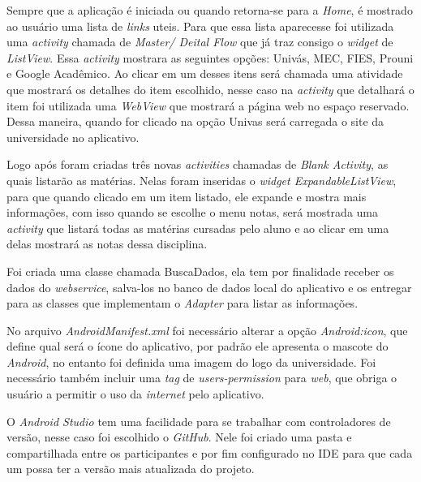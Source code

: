 		\par Sempre que a aplicação é iniciada ou quando retorna-se para a
	\textit{Home}, é mostrado ao usuário uma lista de \textit{links} uteis. Para
	que essa lista aparecesse foi utilizada uma \textit{activity} chamada de
	\textit{Master/ Deital Flow} que já traz consigo o \textit{widget} de
	\textit{ListView}. Essa \textit{activity} mostrara as seguintes opções: Univás,
	MEC, FIES, Prouni e Google Acadêmico. Ao clicar em um desses itens será chamada
	uma atividade que mostrará os detalhes do item escolhido, nesse caso na
	\textit{activity} que detalhará o item foi utilizada uma \textit{WebView} que
	mostrará a página web no espaço reservado. Dessa maneira, quando for clicado na
	opção Univas será carregada o site da universidade no aplicativo.

		\par Logo após foram criadas três novas \textit{activities} chamadas de
	\textit{Blank Activity}, as quais listarão as matérias. Nelas foram inseridas o
	\textit{widget ExpandableListView}, para que quando clicado em um item listado,
	ele expande e mostra mais informações, com isso quando se escolhe o menu notas,
	será mostrada uma \textit{activity} que listará todas as matérias cursadas pelo
	aluno e ao clicar em uma delas mostrará as notas dessa disciplina.

		\par Foi criada uma classe chamada BuscaDados, ela tem por finalidade receber
	os dados do \textit{webservice}, salva-los no banco de dados local do
	aplicativo e os entregar para as classes que implementam o \textit{Adapter}
	para listar as informações.

		\par No arquivo \textit{AndroidManifest.xml} foi necessário alterar a opção
	\textit{Android:icon}, que define qual será o ícone do aplicativo, por padrão
	ele apresenta o mascote do \textit{Android}, no entanto foi definida uma imagem
	do logo da universidade. Foi necessário também incluir uma \textit{tag} de
	\textit{users-permission} para \textit{web}, que obriga o usuário a permitir o
	uso da \textit{internet} pelo aplicativo.

		\par O \textit{Android Studio} tem uma facilidade para se trabalhar com
	controladores de versão, nesse caso foi escolhido o \textit{GitHub}. Nele foi
	criado uma pasta e compartilhada entre os participantes e por fim configurado
	no IDE para que cada um possa ter a versão mais atualizada do projeto.
	
